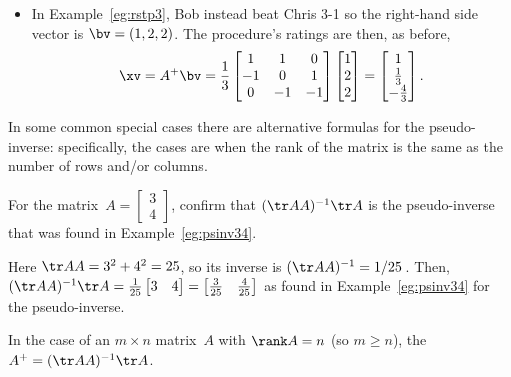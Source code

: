 \begin{example}
\begin{solution}
\begin{itemize}
\item In Example~\ref{eg:rstp3},  Bob instead beat Chris 3-1 so the right-hand side vector is \(\bv=(1,2,2)\).
The procedure's ratings are then, as before, 
\begin{equation*}
\xv=A^+\bv=\frac13\begin{bmatrix} 1&1&0
\\-1&0&1
\\0& -1&-1 \end{bmatrix}\begin{bmatrix} 1\\2\\2 \end{bmatrix}
=\begin{bmatrix} 1\\\frac13\\-\frac43 \end{bmatrix}.
\end{equation*}

\end{itemize}
\end{solution}
\end{example}



In some common special cases there are alternative formulas for the pseudo-inverse: specifically, the cases are when the rank of the matrix is the same as the number of rows and/or columns.

\begin{example}
For the matrix~\(A=\begin{bmatrix} 3\\4 \end{bmatrix}\),
confirm that \((\tr AA)^{-1}\tr A\) is the pseudo-inverse that was found in Example~\ref{eg:psinv34}.
\begin{solution}
Here \(\tr AA=3^2+4^2=25\), so its inverse is \((\tr AA)^{-1}=1/25\)\,.
Then, \((\tr AA)^{-1}\tr A=\frac1{25}\begin{bmatrix} 3&4 \end{bmatrix}=\begin{bmatrix} \tfrac3{25}&\tfrac4{25} \end{bmatrix}\) as found in Example~\ref{eg:psinv34} for the pseudo-inverse.
\end{solution}
\end{example}



\begin{theorem} \label{thm:pseudonormal}
In the case of an \(m\times n\) matrix~\(A\) with \(\rank A=n\) (so \(m\geq n\)), the  \(A^+=(\tr AA)^{-1}\tr A\).
\end{theorem}

